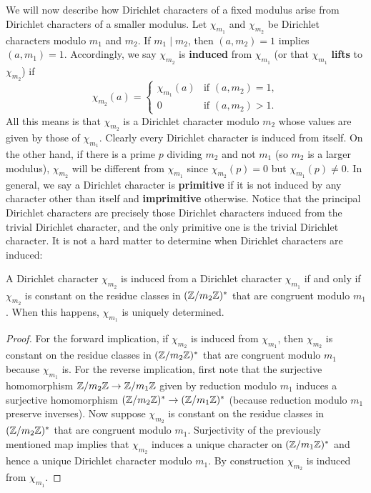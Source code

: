    We will now describe how Dirichlet characters of a fixed modulus arise from Dirichlet characters of a smaller modulus. Let $\chi_{m_{1}}$ and $\chi_{m_{2}}$ be Dirichlet characters modulo $m_{1}$ and $m_{2}$. If $m_{1} \mid m_{2}$, then $(a,m_{2}) = 1$ implies $(a,m_{1}) = 1$. Accordingly, we say $\chi_{m_{2}}$ is \textbf{induced} from $\chi_{m_{1}}$ (or that $\chi_{m_{1}}$ \textbf{lifts} to $\chi_{m_{2}}$) if
    \[
      \chi_{m_{2}}(a) = \begin{cases} \chi_{m_{1}}(a) & \text{if $(a,m_{2}) = 1$}, \\ 0 & \text{if $(a,m_{2}) > 1$}. \end{cases}
    \]
    All this means is that $\chi_{m_{2}}$ is a Dirichlet character modulo $m_{2}$ whose values are given by those of $\chi_{m_{1}}$. Clearly every Dirichlet character is induced from itself. On the other hand, if there is a prime $p$ dividing $m_{2}$ and not $m_{1}$ (so $m_{2}$ is a larger modulus), $\chi_{m_{2}}$ will be different from $\chi_{m_{1}}$ since $\chi_{m_{2}}(p) = 0$ but $\chi_{m_{1}}(p) \neq 0$. In general, we say a Dirichlet character is \textbf{primitive} if it is not induced by any character other than itself and \textbf{imprimitive} otherwise. Notice that the principal Dirichlet characters are precisely those Dirichlet characters induced from the trivial Dirichlet character, and the only primitive one is the trivial Dirichlet character. It is not a hard matter to determine when Dirichlet characters are induced:

    \begin{proposition}\label{prop:Dirichlet_character_induction_classification}
      A Dirichlet character $\chi_{m_{2}}$ is induced from a Dirichlet character $\chi_{m_{1}}$ if and only if $\chi_{m_{2}}$ is constant on the residue classes in $(\mathbb{Z}/m_{2}\mathbb{Z})^{\ast}$ that are congruent modulo $m_{1}$. When this happens, $\chi_{m_{1}}$ is uniquely determined.
    \end{proposition}
    \begin{proof}
      For the forward implication, if $\chi_{m_{2}}$ is induced from $\chi_{m_{1}}$, then $\chi_{m_{2}}$ is constant on the residue classes in $(\mathbb{Z}/m_{2}\mathbb{Z})^{\ast}$ that are congruent modulo $m_{1}$ because $\chi_{m_{1}}$ is. For the reverse implication, first note that the surjective homomorphism $\mathbb{Z}/m_{2}\mathbb{Z} \to \mathbb{Z}/m_{1}\mathbb{Z}$ given by reduction modulo $m_{1}$ induces a surjective homomorphism $(\mathbb{Z}/m_{2}\mathbb{Z})^{\ast} \to (\mathbb{Z}/m_{1}\mathbb{Z})^{\ast}$ (because reduction modulo $m_{1}$ preserve inverses). Now suppose $\chi_{m_{2}}$ is constant on the residue classes in $(\mathbb{Z}/m_{2}\mathbb{Z})^{\ast}$ that are congruent modulo $m_{1}$. Surjectivity of the previously mentioned map implies that $\chi_{m_{2}}$ induces a unique character on $(\mathbb{Z}/m_{1}\mathbb{Z})^{\ast}$ and hence a unique Dirichlet character modulo $m_{1}$. By construction $\chi_{m_{2}}$ is induced from $\chi_{m_{1}}$.
    \end{proof}

